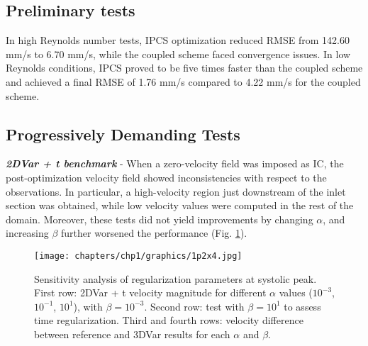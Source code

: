 \subsection*{Preliminary tests}
In high Reynolds number tests, IPCS optimization reduced RMSE from 142.60 mm/s to 6.70 mm/s, while the coupled scheme faced convergence issues. In low Reynolds conditions, IPCS proved to be five times faster than the coupled scheme and achieved a final RMSE of 1.76 mm/s compared to 4.22 mm/s for the coupled scheme.

\subsection*{Progressively Demanding Tests}
\textbf{\textit{2DVar + t benchmark}} - When a zero-velocity field was imposed as IC, the post-optimization velocity field showed inconsistencies with respect to the observations.
In particular, a high-velocity region just downstream of the inlet section was obtained, while low velocity values were computed in the rest of the domain.
Moreover, these tests did not yield improvements by changing \(\alpha\), and increasing \(\beta\) further worsened the performance (Fig. \ref{fig:3.3}).

\begin{figure}
    \centering
    \texttt{[image: chapters/chp1/graphics/1p2x4.jpg]}
    \caption{Sensitivity analysis of regularization parameters at systolic peak. First row: 2DVar + t velocity magnitude for different $\alpha$ values ($10^{-3}$, $10^{-1}$, $10^{1}$), with $\beta = 10^{-3}$. Second row: test with $\beta = 10^{1}$ to assess time regularization. Third and fourth rows: velocity difference between reference and 3DVar results for each $\alpha$ and $\beta$.}
    \label{fig:3.3}
\end{figure}

